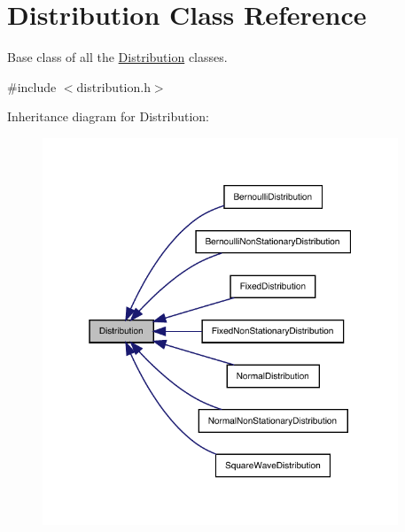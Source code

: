 \hypertarget{class_distribution}{}\section{Distribution Class Reference}
\label{class_distribution}


Base class of all the \mbox{\hyperlink{class_distribution}{Distribution}} classes.  




{\ttfamily \#include $<$distribution.\+h$>$}



Inheritance diagram for Distribution\+:
\nopagebreak
\begin{figure}[H]
\begin{center}
\leavevmode
\includegraphics[width=301pt]{class_distribution__inherit__graph}
\end{center}
\end{figure}
